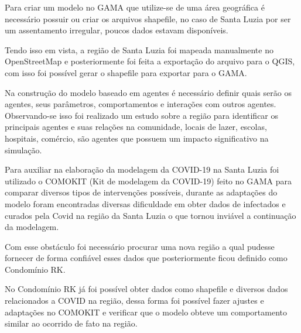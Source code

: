 Para criar um modelo no GAMA que utilize-se de uma área geográfica é necessário possuir ou criar os arquivos shapefile, no caso de Santa Luzia por ser um assentamento irregular, poucos dados estavam disponíveis.

Tendo isso em vista, a região de Santa Luzia foi mapeada manualmente no OpenStreetMap e posteriormente foi feita a exportação do arquivo para o QGIS, com isso foi possível gerar o shapefile para exportar para o GAMA. 

Na construção do modelo baseado em agentes é necessário definir quais serão os agentes, seus parâmetros, comportamentos e interações com outros agentes. Observando-se isso foi realizado um estudo sobre a região para identificar os principais agentes e suas relações na comunidade, locais de lazer, escolas, hospitais, comércio, são agentes que possuem um impacto significativo na simulação.

Para auxiliar na elaboração da modelagem da COVID-19 na Santa Luzia foi utilizado o COMOKIT (Kit de modelagem da COVID-19) feito no GAMA para comparar diversos tipos de intervenções possíveis, durante as adaptações do modelo foram encontradas diversas dificuldade em obter dados de infectados e curados pela Covid na região da Santa Luzia o que tornou inviável a continuação da modelagem.

Com esse obstáculo foi necessário procurar uma nova região a qual pudesse fornecer de forma confiável esses dados que posteriormente ficou definido como Condomínio RK.

No Condomínio RK já foi possível obter dados como shapefile e diversos dados relacionados a COVID na região, dessa forma foi possível fazer ajustes e adaptações no COMOKIT e verificar que o modelo obteve um comportamento similar ao ocorrido de fato na região.






